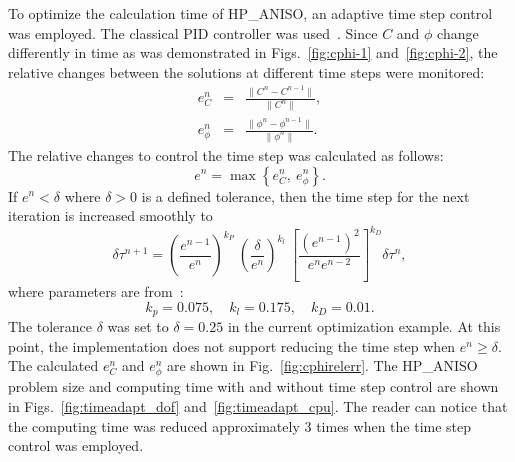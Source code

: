 To optimize the calculation time of HP\_ANISO, an adaptive time step control was employed.
The classical PID controller was used~\cite{valli2002control,dubcova2010space}.
Since $C$ and $\phi$ change differently in time as was demonstrated in Figs.~\ref{fig:cphi-1}
and~\ref{fig:cphi-2}, the relative changes between the solutions at different
time steps were monitored:
\begin{eqnarray}
  e_C^n & = & \frac{\lVert C^n-C^{n-1}\rVert}{\lVert C^n \rVert},\\
  e_\phi^n & = & \frac{\lVert \phi^n-\phi^{n-1}\rVert}{\lVert \phi^n \rVert}.
\end{eqnarray}
The relative changes to control the time step was calculated as follows:
\begin{equation}
  e^n=\max\left\{ e_C^n,\ e_\phi^n \right\}.
\end{equation}
If $e^n < \delta$ where $\delta>0$ is a defined tolerance, then the time
step for the next iteration is increased smoothly to
\begin{equation}
  \delta\tau^{n+1}=\left( \frac{e^{n-1}}{e^n} \right)^{k_P}\ \left( \frac{\delta}{e^n} \right)^{k_l}\
  \left[ \frac{\left( e^{n-1} \right)^2}{e^n e^{n-2}} \right]^{k_D} \delta\tau^n,
\end{equation}
where parameters are from~\cite{valli2002control}:
\begin{equation}
  k_p=0.075,\quad k_l=0.175,\quad k_D=0.01.
\end{equation}
The tolerance $\delta$ was set to $\delta=0.25$ in the current optimization
example. At this point, the implementation does not support
reducing the time step when $e^n\geq \delta$. The calculated $e_C^n$ and $e_\phi^n$ are shown in Fig.~\ref{fig:cphirelerr}.
The HP\_ANISO problem size and computing time with and without time step control
are shown in Figs.~\ref{fig:timeadapt_dof} and~\ref{fig:timeadapt_cpu}. The reader
can notice that the computing time was reduced approximately 3 times when the time
step control was employed.

